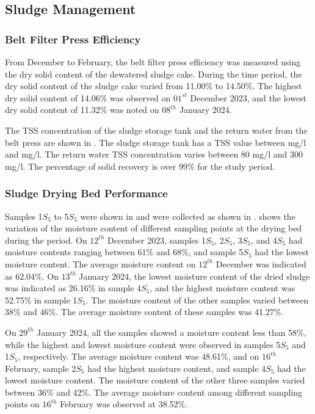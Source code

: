 \newpage
\subsection{Sludge Management}

\subsubsection{Belt Filter Press Efficiency}
From December to February, the belt filter press efficiency was measured using the dry solid content of the dewatered sludge cake. During the time period, the dry solid content of the sludge cake varied from 11.00\% to 14.50\%. The highest dry solid content of 14.06\% was observed on $01^{st}$ December 2023, and the lowest dry solid content of 11.32\% was noted on $08^{th}$ January 2024.

The \ac{TSS} concentration of the sludge storage tank and the return water from the belt press are shown in . The sludge storage tank has a \ac{TSS} value between  mg/l and  mg/l. The return water \ac{TSS} concentration varies between 80 mg/l and 300 mg/l. The percentage of solid recovery is over 99\% for the study period.






\subsubsection{Sludge Drying Bed Performance}
Samples 1$S_5$ to 5$S_5$ were shown in  and were collected as shown in .
 shows the variation of the moisture content of different sampling points at the drying bed during the period. On $12^{th}$ December 2023, samples 1$S_5$, 2$S_5$, 3$S_5$, and 4$S_5$ had moisture contents ranging between 61\% and 68\%, and sample 5$S_5$ had the lowest moisture content. The average moisture content on $12^{th}$ December was indicated as 62.04\%. On $13^{th}$ January 2024, the lowest moisture content of the dried sludge was indicated as 26.16\% in sample 4$S_5$, and the highest moisture content was 52.75\% in sample 1$S_5$. The moisture content of the other samples varied between 38\% and 46\%. The average moisture content of these samples was 41.27\%.

On $29^{th}$ January 2024, all the samples showed a moisture content less than 58\%, while the highest and lowest moisture content were observed in samples 5$S_5$ and 1$S_5$, respectively. The average moisture content was 48.61\%, and on $16^{th}$ February, sample 2$S_5$ had the highest moisture content, and sample 4$S_5$ had the lowest moisture content. The moisture content of the other three samples varied between 36\% and 42\%. The average moisture content among different sampling points on $16^{th}$ February was observed at 38.52\%.

